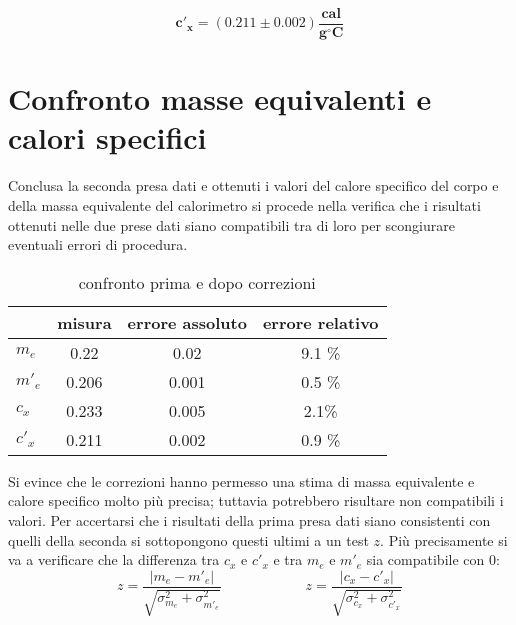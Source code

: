 \documentclass{article}
\begin{document}
	\[ 
	\boxed{\boldsymbol{c'_{x} = (0.211 \pm 0.002) \frac{\text{cal}}{g ^\circ C}}}
	\]
	
	\newpage
	\section{Confronto masse equivalenti e calori specifici}
	Conclusa la seconda presa dati e ottenuti i valori del calore specifico del corpo e della massa equivalente del calorimetro si procede nella verifica che i risultati ottenuti nelle due prese dati siano compatibili tra di loro per scongiurare eventuali errori di procedura.
	
	\begin{table}[H] \centering
		\begin{small}
			\begin{tabular}{@{}lccc@{}}
				&  	\textbf{misura}	& \textbf{errore assoluto} & \textbf{errore relativo}   \\ \bottomrule
				\(m_{e}\) & 0.22   & 0.02 & 9.1 \% \\ \hdashline
				\(m'_{e}\) &0.206 & 0.001 & 0.5 \% \\ \midrule
				\(c_{x}\) & 0.233 & 0.005& 2.1\%\\ \hdashline
				\(c'_{x}\) &0.211 & 0.002& 0.9 \%\\ \bottomrule
			\end{tabular}
			\caption{confronto prima e dopo correzioni}
		\end{small}
	\end{table}
	
	Si evince che le correzioni hanno permesso una stima di massa equivalente e calore specifico molto più precisa; tuttavia potrebbero risultare non compatibili i valori. Per accertarsi che i risultati della prima presa dati siano consistenti con quelli della seconda si sottopongono questi ultimi a un test \(z\). Più precisamente si va a verificare che la differenza tra \(c_{x}\) e \(c'_{x}\) e tra \(m_{e}\) e \(m'_{e}\) sia compatibile con \(0\):
	\[ 
	z = \frac{|m_e-m'_e|}{\sqrt{\sigma_{m_e}^2 + \sigma_{m'_e}^2}}  \qquad \qquad \qquad z = \frac{|c_{x}-c'_{x}|}{\sqrt{\sigma_{c_{x}}^2 + \sigma_{c'_{x}}^2}}
	\]
	
\end{document}
